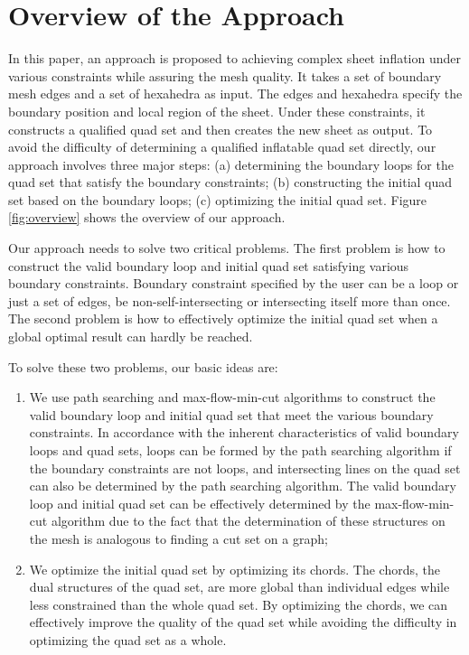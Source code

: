 \documentclass[final,5p,times,twocolumn]{elsarticle}
\begin{document}
\section{Overview of the Approach}
\label{sec:algo_overview}

In this paper, an approach is proposed to achieving complex sheet inflation under various constraints while assuring the mesh quality. It takes a set of boundary mesh edges and a set of hexahedra as input. The edges and hexahedra specify the boundary position and local region of the sheet. Under these constraints, it constructs a qualified quad set and then creates the new sheet as output. To avoid the difficulty of determining a qualified inflatable quad set directly, our approach involves three major steps: (a) determining the boundary loops for the quad set that satisfy the boundary constraints; (b) constructing the initial quad set based on the boundary loops; (c) optimizing the initial quad set. Figure \ref{fig:overview} shows the overview of our approach.

Our approach needs to solve two critical problems. The first problem is how to construct the valid boundary loop and initial quad set satisfying various boundary constraints. Boundary constraint specified by the user can be a loop or just a set of edges, be non-self-intersecting or intersecting itself more than once. The second problem is how to effectively optimize the initial quad set when a global optimal result can hardly be reached.

To solve these two problems, our basic ideas are:
\begin{enumerate}
  \item We use path searching and max-flow-min-cut algorithms to construct the valid boundary loop and initial quad set that meet the various boundary constraints. In accordance with the inherent characteristics of valid boundary loops and quad sets, loops can be formed by the path searching algorithm if the boundary constraints are not loops, and intersecting lines on the quad set can also be determined by the path searching algorithm. The valid boundary loop and initial quad set can be effectively determined by the max-flow-min-cut algorithm due to the fact that the determination of these structures on the mesh is analogous to finding a cut set on a graph;
  \item We optimize the initial quad set by optimizing its chords. The chords, the dual structures of the quad set, are more global than individual edges while less constrained than the whole quad set. By optimizing the chords, we can effectively improve the quality of the quad set while avoiding the difficulty in optimizing the quad set as a whole.
\end{enumerate}
\end{document}
